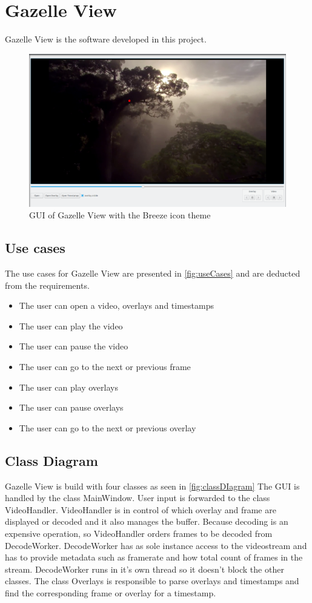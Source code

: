 \chapter{Gazelle View}
\label{chap:gazelleView}
 Gazelle View is the software developed in this project. 
 \begin{figure}[H]
 	\centering
 	\includegraphics[scale=0.25]{images/gui_gazelle_view.png}
 	\caption{GUI of Gazelle View with the Breeze icon theme}
 	\label{fig:guiGazelleView}
 \end{figure}
\section{Use cases}
\label{sec:useCases}
The use cases for Gazelle View are presented in \ref{fig:useCases} and are deducted from the requirements.
\begin{itemize}
	\item The user can open a video, overlays and timestamps
	\item The user can play the video
	\item The user can pause the video
	\item The user can go to the next or previous frame
	\item The user can play overlays
	\item The user can pause overlays
	\item The user can go to the next or previous overlay
\end{itemize}
\section{Class Diagram}
Gazelle View is build with four classes as seen in \ref{fig:classDIagram} The GUI is handled by the class MainWindow. User input is forwarded to the class VideoHandler. VideoHandler is in control of which overlay and frame are displayed or decoded and it also manages the buffer. Because decoding is an expensive operation, so VideoHandler orders frames to be decoded from DecodeWorker. DecodeWorker has as sole instance access to the videostream and has to provide metadata such as framerate and how total count of frames in the stream. DecodeWorker runs in it's own thread so it doesn't block the other classes. The class Overlays is responsible to parse overlays and timestamps and find the corresponding frame or overlay for a timestamp.
